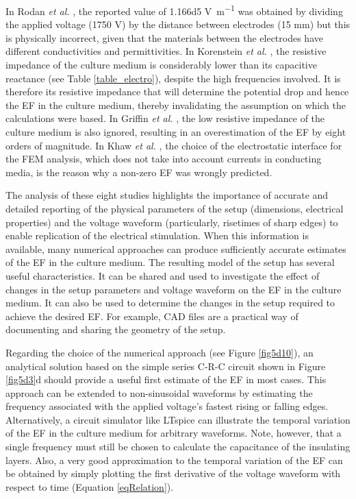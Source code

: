 In Rodan \textit{et al.} \cite{Rodan1978-yu}, the reported value of \num{1.166d5} \si{\volt\per\meter} was obtained by dividing the applied voltage (1750 \si{\volt}) by the distance between electrodes (15 \si{\milli\meter}) but this is physically incorrect, given that the materials between the electrodes have different conductivities and permittivities. In Korenstein \textit{et al.} \cite{Korenstein1984-qb}, the resistive impedance of the culture medium is considerably lower than its capacitive reactance (see Table \ref{table_electro}), despite the high frequencies involved. It is therefore its resistive impedance that will determine the potential drop and hence the \acs{EF} in the culture medium, thereby invalidating the assumption on which the calculations were based. In Griffin \textit{et al.} \cite{Griffin2011-bb}, the low resistive impedance of the culture medium is also ignored, resulting in an overestimation of the \acs{EF} by eight orders of magnitude. In Khaw \textit{et al.} \cite{Khaw2021-tv}, the choice of the electrostatic interface for the \acs{FEM} analysis, which does not take into account currents in conducting media, is the reason why a non-zero \acs{EF} was wrongly predicted.

The analysis of these eight studies highlights the importance of accurate and detailed reporting of the physical parameters of the setup (dimensions, electrical properties) and the voltage waveform (particularly, risetimes of sharp edges) to enable replication of the electrical stimulation. When this information is available, many numerical approaches can produce sufficiently accurate estimates of the \acs{EF} in the culture medium. The resulting model of the setup has several useful characteristics. It can be shared and used to investigate the effect of changes in the setup parameters and voltage waveform on the \acs{EF} in the culture medium. It can also be used to determine the changes in the setup required to achieve the desired \acs{EF}. For example, \acs{CAD} files are a practical way of documenting and sharing the geometry of the setup.

Regarding the choice of the numerical approach (see Figure \ref{fig5d10}), an analytical solution based on the simple series C-R-C circuit shown in Figure \ref{fig5d3}d should provide a useful first estimate of the \acs{EF} in most cases. This approach can be extended to non-sinusoidal waveforms by estimating the frequency associated with the applied voltage's fastest rising or falling edges. Alternatively, a circuit simulator like LTspice can illustrate the temporal variation of the \acs{EF} in the culture medium for arbitrary waveforms. Note, however, that a single frequency must still be chosen to calculate the capacitance of the insulating layers. Also, a very good approximation to the temporal variation of the \acs{EF} can be obtained by simply plotting the first derivative of the voltage waveform with respect to time (Equation \ref{eqRelation}).

